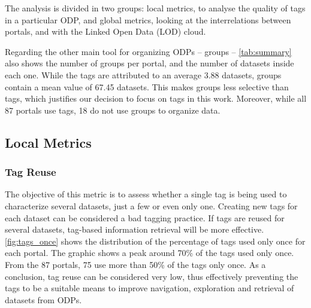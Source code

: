 
The analysis is divided in two groups: local metrics, to analyse the quality of tags in a particular ODP, and global metrics, looking at the interrelations between portals, and with the Linked Open Data (LOD) cloud.

Regarding the other main tool for organizing ODPs -- groups -- \autoref{tab:summary} also shows the number of groups per portal, and the number of datasets inside each one.
While the tags are attributed to an average 3.88 datasets, groups contain a mean value of 67.45 datasets.
This makes groups less selective than tags, which justifies our decision to focus on tags in this work.
Moreover, while all 87 portals use tags, 18 do not use groups to organize data.

\subsection{Local Metrics}
\label{sec:local_metrics}

\subsubsection{Tag Reuse}
The objective of this metric is to assess whether a single tag is being used to characterize several datasets, just a few or even only one.
Creating new tags for each dataset can be considered a bad tagging practice.
If tags are reused for several datasets, tag-based information retrieval will be more effective.
\autoref{fig:tags_once} shows the distribution of the percentage of tags used only once for each portal. 
The graphic shows a peak around 70\% of the tags used only once.
From the 87 portals, 75 use more than 50\% of the tags only once.
As a conclusion, tag reuse can be considered very low, thus effectively preventing the tags to be a suitable means to improve navigation, exploration and retrieval of datasets from ODPs.

